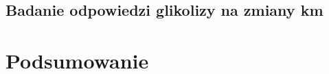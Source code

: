 \documentclass{pracamgr}
\begin{document}
\section{Badanie odpowiedzi glikolizy na zmiany km}



\chapter{Podsumowanie}





\end{document}

